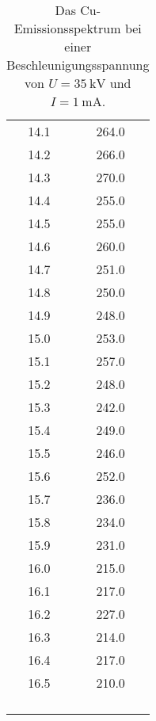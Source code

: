 \begin{table}
\begin{tabular}{S S}
    14.1 & 264.0 \\
    14.2 & 266.0 \\
    14.3 & 270.0 \\
    14.4 & 255.0 \\
    14.5 & 255.0 \\
    14.6 & 260.0 \\
    14.7 & 251.0 \\
    14.8 & 250.0 \\
    14.9 & 248.0 \\
    15.0 & 253.0 \\
    15.1 & 257.0 \\
    15.2 & 248.0 \\
    15.3 & 242.0 \\
    15.4 & 249.0 \\
    15.5 & 246.0 \\
    15.6 & 252.0 \\
    15.7 & 236.0 \\
    15.8 & 234.0 \\
    15.9 & 231.0 \\
    16.0 & 215.0 \\
    16.1 & 217.0 \\
    16.2 & 227.0 \\
    16.3 & 214.0 \\
    16.4 & 217.0 \\
    16.5 & 210.0 \\
         &       \\
         &       \\
         &       \\
         &       \\
    \bottomrule 
    \end{tabular}
\caption{Das Cu-Emissionsspektrum bei einer Beschleunigungsspannung von $U=\SI{35}{\kilo\volt}$ und $I=\SI{1}{\milli\ampere}$.}
\label{tab:spektrum1}
\end{table}

